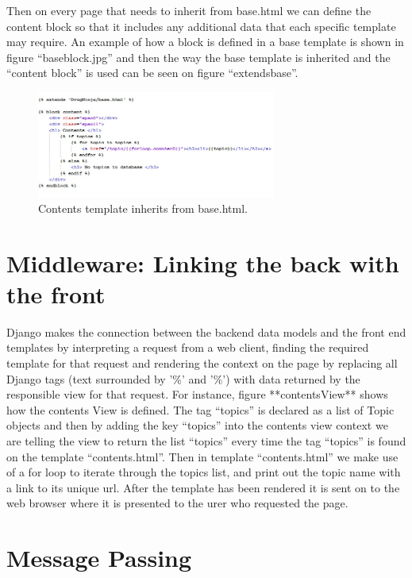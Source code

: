\documentclass{l3proj}
\begin{document}
{\begin{figure}[h!]
\end{figure}
Then on every page that needs to inherit from base.html we can define the content block so that it includes any additional data that each specific template may require. An example of how a block is defined in a base template is shown in figure “baseblock.jpg” and then the way the base template is inherited and the “content block” is used can be seen on figure ``extendsbase''.
\begin{figure}[h!]
   \caption{Contents template inherits from base.html.}
   \centering
     \includegraphics[width=0.7\textwidth]{images/extendsbase.jpg}
\end{figure}

\section{Middleware: Linking the back with the front}
Django makes the connection between the backend data models and the front end templates by interpreting a request from a web client, finding the required template for that request and rendering the context on the page by replacing all Django tags (text surrounded by '{\%' and  '\%}') with data returned by the responsible view for that request.  For  instance, figure **contentsView** shows how the contents View is defined. The tag “topics” is declared as a list of Topic objects and then by adding the key “topics” into the contents view context we are telling the view to return the list “topics” every time the tag “topics” is found on the template “contents.html”. Then in template “contents.html” we make use of a for loop to iterate through the topics list, and print out the topic name with a link to its unique url. After the template has been rendered it is sent on to the web browser where it is presented to the urer who requested the page.
\section{Message Passing}

}
\end{document}
